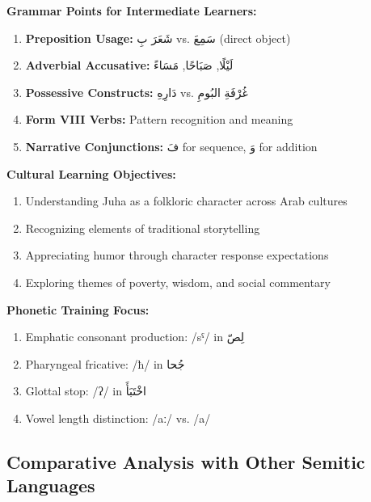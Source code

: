 \documentclass[letter,12pt]{article}
\begin{document}
\begin{tcolorbox}[colback=white,colframe=headercolor,title=\textbf{Teaching Applications},breakable]
\textbf{Grammar Points for Intermediate Learners:}
\begin{enumerate}
\item \textbf{Preposition Usage:} \textarabic{شَعَرَ بِ} vs. \textarabic{سَمِعَ} (direct object)
\item \textbf{Adverbial Accusative:} \textarabic{لَيْلًا}, \textarabic{صَبَاحًا}, \textarabic{مَسَاءً}
\item \textbf{Possessive Constructs:} \textarabic{دَارِهِ} vs. \textarabic{غُرْفَةِ البُومِ}
\item \textbf{Form VIII Verbs:} Pattern recognition and meaning
\item \textbf{Narrative Conjunctions:} \textarabic{فَ} for sequence, \textarabic{وَ} for addition
\end{enumerate}

\textbf{Cultural Learning Objectives:}
\begin{enumerate}
\item Understanding Juha as a folkloric character across Arab cultures
\item Recognizing elements of traditional storytelling
\item Appreciating humor through character response expectations
\item Exploring themes of poverty, wisdom, and social commentary
\end{enumerate}

\textbf{Phonetic Training Focus:}
\begin{enumerate}
\item Emphatic consonant production: /sˤ/ in \textarabic{لِصّ}
\item Pharyngeal fricative: /ħ/ in \textarabic{جُحا}
\item Glottal stop: /ʔ/ in \textarabic{اخْتَبَأَ}
\item Vowel length distinction: /aː/ vs. /a/
\end{enumerate}
\end{tcolorbox}

\subsection{Comparative Analysis with Other Semitic Languages}
\end{document}

